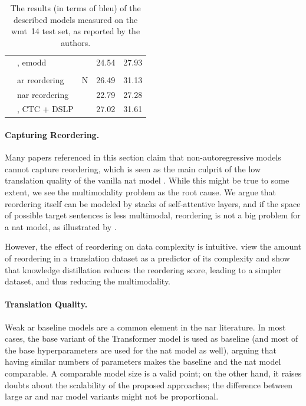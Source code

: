 \begin{table}
\begin{adjustbox}{totalheight=\baselineskip}
\begin{tabular}{cl>{\ignorecolumn}r@{}cc}
    & \citet{sun2020em}, \acs{emodd} & \JH{??} & 24.54 & 27.93 \\

    & \citet{ran-etal-2021-guiding} & & &  \\
    & \quad \acs{ar} reordering & N & 26.49 & 31.13  \\
    & \quad \acs{nar} reordering & 1\footnotemark\JH{..} & 22.79 & 27.28 \\

    & \citet{huang-etal-2021-nonautoregressive}, CTC + DSLP &\JH{?} & 27.02  &  31.61 \\
    \bottomrule
  \end{tabular}
  \end{adjustbox}
  \caption{The results (in terms of \acs{bleu}) of the described models
    measured on the \acs{wmt}~14 test set, as reported by the authors.}%
  \label{tab:related:wmt14}
\end{table}

\paragraph{Capturing Reordering.} Many papers referenced in this section claim
that non-autoregressive models cannot capture reordering, which is seen as the
main culprit of the low translation quality of the vanilla \acs{nat} model
\citep{gu-kong-2021-fully, ran-etal-2021-guiding}.  While this might be true to
some extent, we see the multimodality problem as the root cause.  We argue that
reordering itself can be modeled by stacks of self-attentive layers, and if the
space of possible target sentences is less multimodal, reordering is not a big
problem for a \acs{nat} model, as illustrated by \citet{du2021orderagnostic}.

However, the effect of reordering on data complexity is intuitive.
\citet{zhou-etal-2020-understanding} view the amount of reordering in a
translation dataset as a predictor of its complexity and show that knowledge
distillation reduces the reordering score, leading to a simpler dataset, and
thus reducing the multimodality.

\paragraph{Translation Quality.} Weak \acl{ar} baseline models are a common
element in the \acl{nar} literature. In most cases, the base variant of the
Transformer model is used as baseline (and most of the base hyperparameters are
used for the \ac{nat} model as well), arguing that having similar numbers of
parameters makes the baseline and the \ac{nat} model comparable. A comparable
model size is a valid point; on the other hand, it raises doubts about the
scalability of the proposed approaches; the difference between large \ac{ar}
and \ac{nar} model variants might not be proportional.


